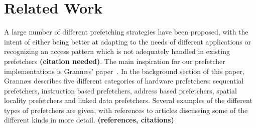 
\section{Related Work}
\label{sec:relatedWork}

A large number of different prefetching strategies have been proposed,
with the intent of either being better at adapting to the needs of
different applications or recognizing an access pattern which is not
adequately handled in existing prefetchers \textbf{(citation
  needed)}. The main inspiration for our prefetcher implementations is
Grannæs' paper~\cite{Grannas}. In the background section of this
paper, Grannæs describes five different categories of hardware
prefetchers: sequential prefetchers, instruction based prefetchers,
address based prefetchers, spatial locality prefetchers and linked
data prefetchers. Several examples of the different types of
prefetchers are given, with references to articles discussing some of
the different kinds in more detail.  {\bf (references, citations)}
